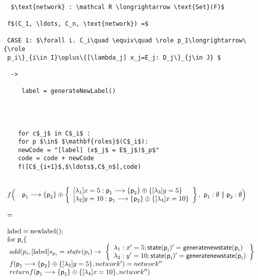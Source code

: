 \newpage

\begin{lstlisting}[mathescape=true,backgroundcolor={}]

  $\text{network} : \mathcal R \longrightarrow \text{Set}(F)$
  
 f$(C_1, \ldots, C_n, \text{network}) =$ 
  
 CASE 1: $\forall i. C_i\quad \equiv\quad \role p_1\longrightarrow\{\role
 p_i\}_{i\in I}\oplus\{[\lambda_j] x_j=E_j: D_j\}_{j\in J} $

  ->
 
     label = generateNewLabel()




    for c$_j$ in C$_i$ :
    for p $\in$ $\mathbf{roles}$(C$_i$):
    newCode = "[label] (x$_j$ = E$_j$)$_p$"
    code = code + newCode
    f([C$_{i+1}$,$\ldots$,C$_n$],code)
 
\end{lstlisting}    


	
\begin{displaymath}
  \begin{array}{ll}
    f\Big(\quad \textsf{p}_1\longrightarrow\{\textsf{p}_2\} \oplus
    \left\{
    \begin{array}{l}{}
      [\lambda_1] x=5:  \textsf{p}_1\longrightarrow\{\textsf{p}_2\} \oplus\{[\lambda_3] y=5\}
      \\{}
      [\lambda_2] y=10: \textsf{p}_1\longrightarrow\{\textsf{p}_2\} \oplus\{[\lambda_4] x=10\}
    \end{array}
    \right\}
    , \ \textsf{p}_1:\emptyset\ |\!|\ \textsf{p}_2:\emptyset
    \Big)
    \\\\
    =
    \\\\
    \text{label} = \text{newlabel}();\\
    \text{for } \textsf{p}_i \{\\
    \ add(p_i, [\text{label}] {s_{p_i} = state(p_i)} \rightarrow\
    \left\{
    \begin{array}{ll}
      \lambda_1: x'=5; \textsf{state}(\textsf{p}_i)' = \textsf{generatenewstate} (\textsf{p}_i)
      \\
      \lambda_2: y'=10; \textsf{state}(\textsf{p}_i)' = \textsf{generatenewstate} (\textsf{p}_i)
    \end{array}
    \right\}
    \\

    \ f(\textsf{p}_1\longrightarrow\{\textsf{p}_2\} \oplus\{[\lambda_3] y=5\}, network') = network''\\
    \ return f(\textsf{p}_1\longrightarrow\{\textsf{p}_2\} \oplus\{[\lambda_4] x=10\}, network'')
    
  \end{array}
\end{displaymath}

